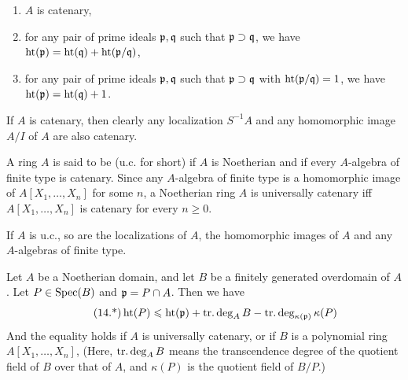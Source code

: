 \documentclass[../main]{subfiles}
\begin{document}
\begin{enumerate}[label=(\arabic*)]
    \item $A$ is catenary,
    \item for any pair of prime ideals $\mathfrak{p}, \mathfrak{q}$ such that $\mathfrak{p} \supset \mathfrak{q}$, we have\newline $\operatorname{ht}(\mathfrak{p})=\operatorname{ht}(\mathfrak{q})+\operatorname{ht}(\mathfrak{p}/\mathfrak{q})$,
    \item for any pair of prime ideals $\mathfrak{p}, \mathfrak{q}$ such that $\mathfrak{p} \supset \mathfrak{q}$ with $\operatorname{ht}(\mathfrak{p} / \mathfrak{q})=1$, we have $\operatorname{ht}(\mathfrak{p})=\operatorname{ht}(\mathfrak{q})+1$.
\end{enumerate}

If $A$ is catenary, then clearly any localization $S^{-1}A$ and any homomorphic image $A / I$ of $A$ are also catenary.

A ring $A$ is said to be  (u.c. for short) if $A$ is Noetherian and if every $A$-algebra of finite type is catenary. Since any $A$-algebra of finite type is a homomorphic image of $A[X_1, \ldots, X_n]$ for some $n$, a Noetherian ring $A$ is universally catenary iff $A[X_1, \ldots, X_n]$ is catenary for every $n \geqslant 0$.

If $A$ is u.c., so are the localizations of $A$, the homomorphic images of $A$ and any $A$-algebras of finite type.

\begin{partheorem}\label{thm:023}
Let $A$ be a Noetherian domain, and let $B$ be a finitely generated overdomain of $A$. Let $P \in \operatorname{Spec}(B)$ and $\mathfrak{p}=P \cap A$. Then we have
\[\tag{14.*}\label{cond:14.*}\operatorname{ht}(P) \leqslant \operatorname{ht}(\mathfrak{p})+\operatorname{tr. deg}_A B-\operatorname{tr. deg}_{\kappa(\mathfrak{p})}\kappa(P)\]
And the equality holds if $A$ is universally catenary, or if $B$ is a polynomial ring $A[X_1, \ldots, X_n]$, (Here, $\operatorname{tr. deg}_AB$ means the transcendence degree of the quotient field of $B$ over that of $A$, and $\kappa(P)$ is the quotient field of $B / P$.)
\end{partheorem}
\end{document}
